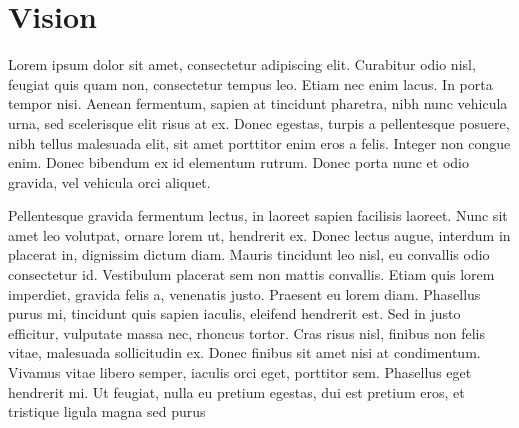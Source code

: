 \chapter{Vision}
\label{s:vision}

Lorem ipsum dolor sit amet, consectetur adipiscing elit. Curabitur odio nisl, feugiat quis quam non, consectetur tempus leo. Etiam nec enim lacus. In porta tempor nisi. Aenean fermentum, sapien at tincidunt pharetra, nibh nunc vehicula urna, sed scelerisque elit risus at ex. Donec egestas, turpis a pellentesque posuere, nibh tellus malesuada elit, sit amet porttitor enim eros a felis. Integer non congue enim. Donec bibendum ex id elementum rutrum. Donec porta nunc et odio gravida, vel vehicula orci aliquet.

Pellentesque gravida fermentum lectus, in laoreet sapien facilisis laoreet. Nunc sit amet leo volutpat, ornare lorem ut, hendrerit ex. Donec lectus augue, interdum in placerat in, dignissim dictum diam. Mauris tincidunt leo nisl, eu convallis odio consectetur id. Vestibulum placerat sem non mattis convallis. Etiam quis lorem imperdiet, gravida felis a, venenatis justo. Praesent eu lorem diam. Phasellus purus mi, tincidunt quis sapien iaculis, eleifend hendrerit est. Sed in justo efficitur, vulputate massa nec, rhoncus tortor. Cras risus nisl, finibus non felis vitae, malesuada sollicitudin ex. Donec finibus sit amet nisi at condimentum. Vivamus vitae libero semper, iaculis orci eget, porttitor sem. Phasellus eget hendrerit mi. Ut feugiat, nulla eu pretium egestas, dui est pretium eros, et tristique ligula magna sed purus
